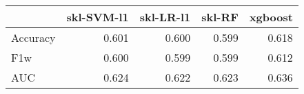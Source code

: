 \begin{tabular}{lrrrr}
\toprule
{} &  skl-SVM-l1 &  skl-LR-l1 &  skl-RF &  xgboost \\
\midrule
Accuracy &       0.601 &      0.600 &   0.599 &    0.618 \\
F1w      &       0.600 &      0.599 &   0.599 &    0.612 \\
AUC      &       0.624 &      0.622 &   0.623 &    0.636 \\
\bottomrule
\end{tabular}
